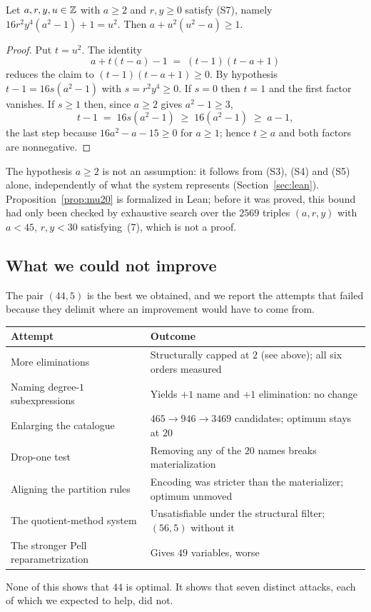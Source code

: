 \begin{proposition}
\label{prop:mu20}
Let $a,r,y,u\in\mathbb{Z}$ with $a\ge 2$ and $r,y\ge 0$ satisfy \textup{(S7)}, namely
$16r^2y^4(a^2-1)+1=u^2$. Then $a+u^2(u^2-a)\ge 1$.
\end{proposition}

\begin{proof}
Put $t=u^2$. The identity
\[
  a+t(t-a)-1 \;=\; (t-1)(t-a+1)
\]
reduces the claim to $(t-1)(t-a+1)\ge 0$. By hypothesis
$t-1=16s(a^2-1)$ with $s=r^2y^4\ge 0$. If $s=0$ then $t=1$ and the first factor
vanishes. If $s\ge 1$ then, since $a\ge 2$ gives $a^2-1\ge 3$,
\[
  t-1 \;=\; 16s(a^2-1)\;\ge\; 16(a^2-1)\;\ge\; a-1 ,
\]
the last step because $16a^2-a-15\ge 0$ for $a\ge 1$; hence $t\ge a$ and both
factors are nonnegative.
\end{proof}

The hypothesis $a\ge 2$ is not an assumption: it follows from
\textup{(S3)}, \textup{(S4)} and \textup{(S5)} alone, independently of what the
system represents (Section~\ref{sec:lean}). Proposition~\ref{prop:mu20} is
formalized in Lean;
before it was proved, this bound had only been checked by exhaustive search over
the $2569$ triples $(a,r,y)$ with $a<45$, $r,y<30$ satisfying~(7), which is not
a proof.

\subsection{What we could not improve}

The pair $(44,5)$ is the best we obtained, and we report the attempts that
failed because they delimit where an improvement would have to come from.

\begin{center}
\begin{tabular}{@{}ll@{}}
\toprule
\textbf{Attempt} & \textbf{Outcome} \\
\midrule
More eliminations & Structurally capped at $2$ (see above); all six orders measured \\
Naming degree-$1$ subexpressions & Yields $+1$ name and $+1$ elimination: no change \\
Enlarging the catalogue & $465\to946\to3469$ candidates; optimum stays at $20$ \\
Drop-one test & Removing any of the $20$ names breaks materialization \\
Aligning the partition rules & Encoding was stricter than the materializer; optimum unmoved \\
The quotient-method system & Unsatisfiable under the structural filter; $(56,5)$ without it \\
The stronger Pell reparametrization & Gives $49$ variables, worse \\
\bottomrule
\end{tabular}
\end{center}

None of this shows that $44$ is optimal. It shows that seven distinct attacks,
each of which we expected to help, did not.
